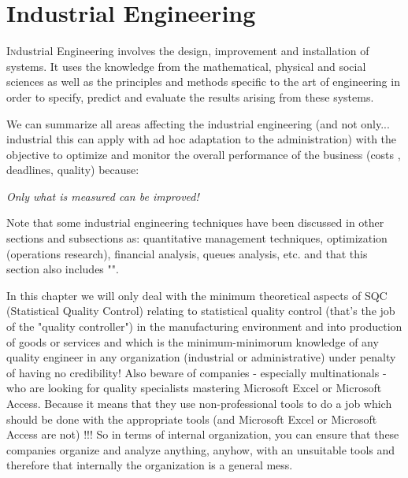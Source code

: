 	\newpage
	\thispagestyle{empty}
	\mbox{}
	\section{Industrial Engineering}\label{industrial engineering}
	\lettrine[lines=4]{\color{BrickRed}I}ndustrial Engineering involves the design, improvement and installation of systems. It uses the knowledge from the mathematical, physical and social sciences as well as the principles and methods specific to the art of engineering in order to specify, predict and evaluate the results arising from these systems.

We can summarize all areas affecting the industrial engineering (and not only... industrial this can apply with ad hoc adaptation to the administration) with the objective to optimize and monitor the overall performance of the business (costs , deadlines, quality) because:
\begin{center}
\textit{Only what is measured can be improved!}	
\end{center}
Note that some industrial engineering techniques have been discussed in other sections and subsections as: quantitative management techniques, optimization (operations research), financial analysis, queues analysis, etc. and that this section also includes "".

In this chapter we will only deal with the minimum theoretical aspects of SQC (Statistical Quality Control) relating to statistical quality control (that's the job of the "quality controller") in the manufacturing environment and into production of goods or services and which is the minimum-minimorum knowledge of any quality engineer in any organization (industrial or administrative) under penalty of having no credibility! Also beware of companies - especially multinationals - who are looking for quality specialists mastering Microsoft Excel or Microsoft Access. Because it means that they use non-professional tools to do a job which should be done with the appropriate tools (and Microsoft Excel or Microsoft Access are not) !!! So in terms of internal organization, you can ensure that these companies organize and analyze anything, anyhow, with an unsuitable tools and therefore that internally the organization is a general mess.

